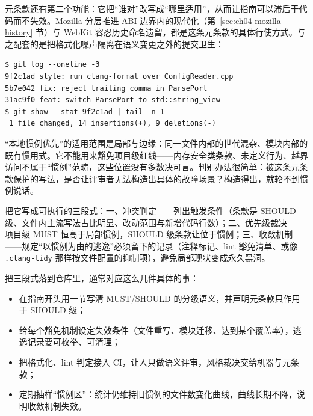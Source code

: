 \documentclass[12pt,a4paper,fontset=fandol]{ctexbook}
\newcommand{\Tp}[1]{\texttt{#1}}
\begin{document}
元条款还有第二个功能：它把``谁对''改写成``哪里适用''，从而让指南可以滞后于代码而不失效。Mozilla 分层推进 ABI 边界内的现代化（第~\ref{sec:ch04-mozilla-history} 节）与 WebKit 容忍历史命名遗留，都是这条元条款的具体行使方式。与之配套的是把格式化噪声隔离在语义变更之外的提交卫生：

\begin{lstlisting}[style=shellstyle,caption={格式化独立成提交，让元条款的行使痕迹可审计},label={lst:ch04-blame-split}]
$ git log --oneline -3
9f2c1ad style: run clang-format over ConfigReader.cpp
5b7e042 fix: reject trailing comma in ParsePort
31ac9f0 feat: switch ParsePort to std::string_view
$ git show --stat 9f2c1ad | tail -n 1
 1 file changed, 14 insertions(+), 9 deletions(-)
\end{lstlisting}

\begin{warning}[title={元条款不是评审逃逸舱}]
``本地惯例优先''的适用范围是局部与边缘：同一文件内部的世代混杂、模块内部的既有惯用式。它不能用来豁免项目级红线——内存安全类条款、未定义行为、越界访问不属于``惯例''范畴，这些位置没有多数决可言。判别办法很简单：被这条元条款保护的写法，是否让评审者无法构造出具体的故障场景？构造得出，就轮不到惯例说话。
\end{warning}

\begin{guideline}[title={怎么写这条元条款}]
把它写成可执行的三段式：一、冲突判定——列出触发条件（条款是 SHOULD 级、文件内主流写法占比明显、改动范围与新增代码行数）；二、优先级裁决——项目级 MUST 恒高于局部惯例，SHOULD 级条款让位于惯例；三、收敛机制——规定``以惯例为由的逃逸''必须留下的记录（注释标记、lint 豁免清单、或像 \Tp{.clang-tidy} 那样按文件配置的抑制项），避免局部现状变成永久黑洞。
\end{guideline}

把三段式落到仓库里，通常对应这么几件具体的事：

\begin{itemize}
  \item 在指南开头用一节写清 MUST/SHOULD 的分级语义，并声明元条款只作用于 SHOULD 级；
  \item 给每个豁免机制设定失效条件（文件重写、模块迁移、达到某个覆盖率），逃逸记录要可枚举、可清理；
  \item 把格式化、lint 判定接入 CI，让人只做语义评审，风格裁决交给机器与元条款；
  \item 定期抽样``惯例区''：统计仍维持旧惯例的文件数变化曲线，曲线长期不降，说明收敛机制失效。
\end{itemize}
\end{document}
